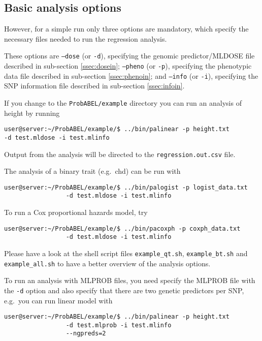 \documentclass[12pt,a4paper]{article}
\begin{document}
\subsection{Basic analysis options}
However, for a simple run only three options are mandatory, which
specify the necessary files needed to run the regression analysis.

These options are
\texttt{--dose} (or \texttt{-d}),
specifying the genomic predictor/MLDOSE file described in sub-section \ref{ssec:dosein};
\texttt{--pheno} (or \texttt{-p}),
specifying the phenotypic data file described in sub-section \ref{ssec:phenoin}; and
\texttt{--info} (or \texttt{-i}),
specifying the SNP information file described in sub-section \ref{ssec:infoin}.

If you change to the \texttt{ProbABEL/example} directory you can run
an analysis of height by running
\begin{verbatim}
user@server:~/ProbABEL/example/$ ../bin/palinear -p height.txt
-d test.mldose -i test.mlinfo
\end{verbatim}
Output from the analysis will be directed to the
\texttt{regression.out.csv} file.

The analysis of a binary trait (e.g.~chd) can be run with
\begin{verbatim}
user@server:~/ProbABEL/example/$ ../bin/palogist -p logist_data.txt
				 -d test.mldose -i test.mlinfo
\end{verbatim}

To run a Cox proportional hazards model, try
\begin{verbatim}
user@server:~/ProbABEL/example/$ ../bin/pacoxph -p coxph_data.txt
				 -d test.mldose -i test.mlinfo
\end{verbatim}

Please have a look at the shell script files \texttt{example\_qt.sh},
\texttt{example\_bt.sh} and \texttt{example\_all.sh} to have
a better overview of the analysis options.

To run an analysis with MLPROB files, you need specify the MLPROB file
with the \texttt{-d} option and also specify that there are two
genetic predictors per SNP, e.g.~you can run linear model with
\begin{verbatim}
user@server:~/ProbABEL/example/$ ../bin/palinear -p height.txt
				 -d test.mlprob -i test.mlinfo
				 --ngpreds=2
\end{verbatim}
\end{document}
